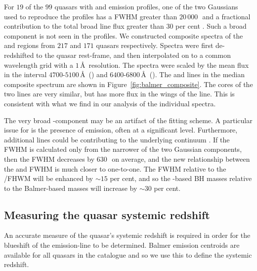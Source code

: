 For $19$ of the $99$ quasars with \hb and \ha emission profiles, one of the two Gaussians used to reproduce the \hb profiles has a FWHM greater than $20$\,$000$\,\kms\, and a fractional contribution to the total \hb broad line flux greater than $30$ per cent \citep{marziani09,marziani13}.  
Such a broad component is not seen in the \ha profiles. 
We constructed composite spectra of the \ha and \hb regions from $217$ and $171$ quasars respectively. 
Spectra were first de-redshifted to the quasar rest-frame, and then interpolated on to a common wavelength grid with a $1$\,\AA\, resolution. 
The spectra were scaled by the mean flux in the interval $4700$-$5100$\,\AA\, (\hbns) and $6400$-$6800$\,\AA\, (\hans). 
The \ha and \hb lines in the median composite spectrum are shown in Figure~\ref{fig:balmer_composite}.
The cores of the two lines are very similar, but \hb has more flux in the wings of the line. 
This is consistent with what we find in our analysis of the individual spectra. 

The very broad \hbns-component may be an artifact of the fitting scheme.
A particular issue for \hb is the presence of  emission, often at a significant level.
Furthermore, additional lines could be contributing to the underlying continuum \citep[e.g. the \ll$4922$,$5017$ doublet;][]{veron02,zamfir10}. 
If the \hb FWHM is calculated only from the narrower of the two Gaussian components, then the \hb FWHM decreases by $630$\,\kms\, on average, and the new relationship between the \ha and \hb FWHM is much closer to one-to-one. 
The  FWHM relative to the \hans/\hb FHWM will be enhanced by $\sim15$ per cent, and so the -based BH masses relative to the Balmer-based masses will increase by $\sim30$ per cent. 

\subsection{Measuring the quasar systemic redshift}
\label{sec:zsys}

An accurate measure of the quasar's systemic redshift is required in order for the blueshift of the  emission-line to be determined.
Balmer emission centroids are available for all quasars in the catalogue and so we use this to define the systemic redshift.

